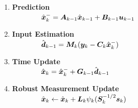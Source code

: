 \documentclass[handout, aspectratio=169]{beamer}
\begin{document}
\begin{frame}[fragile] %
    \frametitle{} %
    \begin{columns}[T]
        \begin{column}{0.55\textwidth}
            \begin{tcolorbox}[colbacktitle=title1, title=\textbf{Key Steps}]
                \begin{enumerate}
                    \item \textbf{Prediction} \vspace{0.75mm} \\ %
                    $ \qquad \qquad \hat{{\bm{x}}}_k^{-} = {\bm{A}}_{k-1}\hat{{\bm{x}}}_{k-1} + {\bm{B}}_{k-1}{\bm{u}}_{k-1} $ \pause
                    \vspace{1mm} %

                    \item \textbf{Input Estimation} \vspace{0.75mm} \\ %
                    $\qquad \qquad \hat{{\bm{d}}}_{k-1} = {\bm{M}}_k({\bm{y}}_k - {\bm{C}}_k\hat{{\bm{x}}}_k^{-})$ \pause
                     \vspace{1mm}

                    \item \textbf{Time Update} \vspace{0.75mm} \\ %
                    $ \qquad \qquad \hat{{\bm{x}}}_k = \hat{{\bm{x}}}_k^{-} + {\bm{G}}_{k-1}\hat{{\bm{d}}}_{k-1}$ \pause %
                     \vspace{1mm}

                    \item \textbf{Robust Measurement Update} \vspace{0.75mm} \\ %
                    $\qquad \qquad \hat{{\bm{x}}}_k \leftarrow \hat{{\bm{x}}}_k + {\bm{L}}_k \psi_k({\bm{S}}_k^{-1/2}{\bm{s}}_k)$ \pause
                \end{enumerate}
            \end{tcolorbox}
        \end{column}


\end{columns}
\end{frame}
\end{document}

